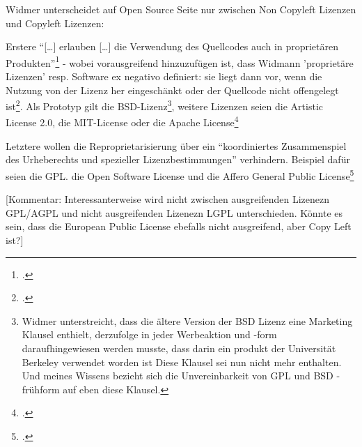 \documentclass[DIV=calc,BCOR=5mm,11pt,headings=small,oneside,abstract=true, toc=bib]{scrartcl}
\begin{document}
 Widmer unterscheidet auf Open Source Seite nur zwischen Non Copyleft Lizenzen
 und Copyleft Lizenzen: 
 
 Erstere \enquote{[\ldots] erlauben [\ldots] die Verwendung des Quellcodes auch in
 proprietären Produkten}\footcite[vgl.][37]{Widmer2003a} - wobei
 vorausgreifend hinzuzufügen ist, dass Widmann 'proprietäre Lizenzen' resp.
 Software ex negativo definiert: sie liegt dann vor, wenn die Nutzung von der
 Lizenz her eingeschänkt oder der Quellcode nicht offengelegt
 ist\footcite[vgl.][39]{Widmer2003a}. Als Prototyp gilt die
 BSD-Lizenz\footnote{Widmer unterstreicht, dass die ältere Version der BSD
 Lizenz eine Marketing Klausel enthielt, derzufolge in jeder Werbeaktion und
 -form daraufhingewiesen werden musste, dass darin ein produkt der Universität
 Berkeley verwendet worden ist\cite[vgl.][37]{Widmer2003a} Diese Klausel sei
 nun nicht mehr enthalten. Und meines Wissens bezieht sich die Unvereinbarkeit
 von GPL und BSD - frühform auf eben diese Klausel.}, weitere Lizenzen seien die
 Artistic License 2.0, die MIT-License oder die Apache
 License\footcite[vgl.][38]{Widmer2003a}
 
 Letztere wollen die Reproprietarisierung über ein \enquote{koordiniertes
 Zusammenspiel des Urheberechts und spezieller Lizenzbestimmungen}
 verhindern. Beispiel dafür seien die GPL. die Open Software License und die
 Affero General Public License\footcite[vgl.][38]{Widmer2003a}
 
 [Kommentar: Interessanterweise wird nicht zwischen ausgreifenden Lizenezn
 GPL/AGPL und nicht ausgreifenden Lizenezn LGPL unterschieden. Könnte es sein,
 dass die European Public License ebefalls nicht ausgreifend, aber Copy Left
 ist?]
 
\end{document}
